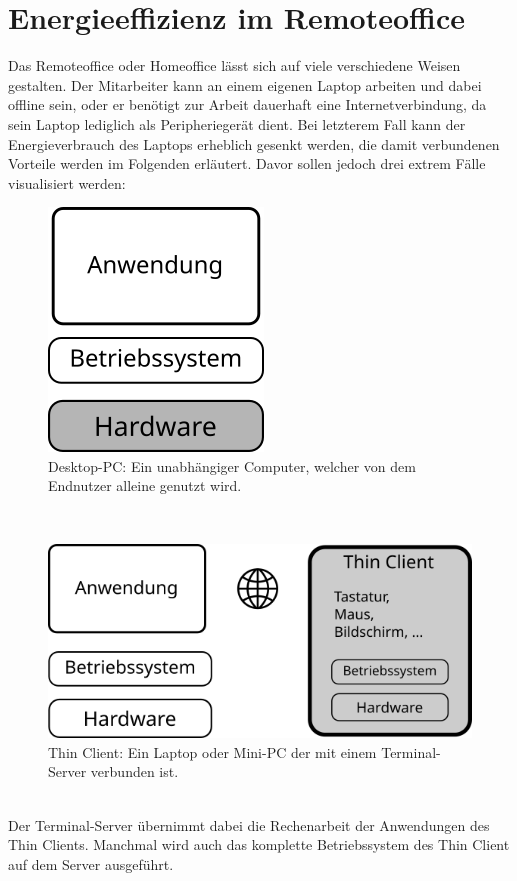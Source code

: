 \documentclass{wseminar}
\begin{document}
\begin{sloppypar}
	\section{Energieeffizienz im Remoteoffice}	
	Das Remoteoffice oder Homeoffice lässt sich auf viele verschiedene Weisen gestalten.
Der Mitarbeiter kann an einem eigenen Laptop arbeiten und dabei offline sein, oder er benötigt zur Arbeit dauerhaft eine Internetverbindung, da sein Laptop lediglich als Peripheriegerät dient.
Bei letzterem Fall kann der Energieverbrauch des Laptops erheblich gesenkt werden, die damit verbundenen Vorteile werden im Folgenden erläutert.
Davor sollen jedoch drei extrem Fälle visualisiert werden:
\begin{figure}[!htb]
    \captionsetup{width=.8\linewidth}
    \includegraphics[height=.3\linewidth]{images/virtualization/no}
    \centering
    \caption{Desktop-PC: Ein unabhängiger Computer, welcher von dem Endnutzer alleine genutzt wird.}
    \label{fig:virt-no}
\end{figure}\\
\begin{figure}[!htb]
    \captionsetup{width=.8\linewidth}
    \includegraphics[width=.8\linewidth]{images/virtualization/thin}
    \centering
    \caption{Thin Client: Ein Laptop oder Mini-PC der mit einem Terminal-Server verbunden ist.}
    \label{fig:virt-thin}
\end{figure}\\
Der Terminal-Server übernimmt dabei die Rechenarbeit der Anwendungen des Thin Clients.
Manchmal wird auch das komplette Betriebssystem des Thin Client auf dem Server ausgeführt.

\end{sloppypar}
\end{document}
